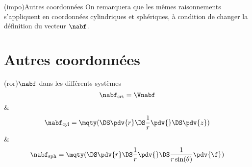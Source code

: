 \documentclass[a4paper, 12pt, garamond]{book}
\begin{document}
\begin{tcb}(impo){Autres coordonnées}
	On remarquera que les mêmes raisonnements s'appliquent en coordonnées
	cylindriques et sphériques, à condition de changer la définition du vecteur
	$\nabf$.
\end{tcb}

\section{Autres coordonnées}

\begin{tcb}[tabularx={Y|Y|Y}](ror){$\nabf$ dans les différents systèmes}
\[
  \nabf_{\rm crt} = \Vnabf
\]
&
\[
  \nabf_{\rm cyl} = \mqty(
  \DS \pdv{r}
  \\[1em]
  \DS \frac{1}{r} \pdv{\tt}
  \\[1em]
  \DS \pdv{z}
  )
\]
&
\[
  \nabf_{\rm sph} = \mqty(
  \DS \pdv{r}
  \\[1em]
  \DS \frac{1}{r} \pdv{\tt}
  \\[1em]
  \DS \frac{1}{r\sin(\theta)}\pdv{\f}
  )
\]
\end{tcb}
\end{document}
